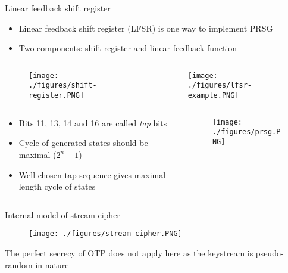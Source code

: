 \documentclass{beamer}
\begin{document}
\begin{frame}{Linear feedback shift register}
	\footnotesize{
	\begin{itemize}
		\item Linear feedback shift register (LFSR) is one way to implement PRSG
		\item Two components: shift register and linear feedback function
	\end{itemize}
	}
	\begin{columns}
	
	\begin{column}{6cm}
	\begin{figure}[htp]
	\centering
	\texttt{[image: ./figures/shift-register.PNG]}
	\end{figure}
	\end{column}
	
	\begin{column}{6cm}
	\begin{figure}[htp]
	\centering
	\texttt{[image: ./figures/lfsr-example.PNG]}
	\end{figure}
	\end{column}	

	\end{columns}

	\begin{columns}
	\begin{column}{6cm}
	\footnotesize{
	\begin{itemize}
		\item Bits 11, 13, 14 and 16 are called \emph{tap} bits
		\item Cycle of generated states should be maximal ($2^n - 1$)
		\item Well chosen tap sequence gives maximal length cycle of states
	\end{itemize}}
	\end{column}	
	
	\begin{column}{6cm}
	\begin{figure}[htp]
	\centering
	\texttt{[image: ./figures/prsg.PNG]}
	\end{figure}
	\end{column}	
	\end{columns}	
\end{frame}	

\begin{frame}{Internal model of stream cipher}

  \begin{figure}[htp]
	\centering
	\texttt{[image: ./figures/stream-cipher.PNG]}
	\end{figure}

	\begin{itemize}
		\footnotesize{\item The perfect secrecy of OTP does not apply here as the keystream is pseudo-random in nature}
	\end{itemize}
\end{frame}
\end{document}
